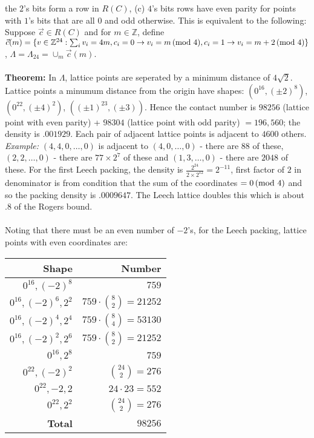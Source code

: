 the $2$'s bits form a row in $R(C)$, (c) $4$'s bits rows have even parity for points
with $1$'s bits that are all $0$ and odd otherwise. This is equivalent to the following:
Suppose ${\vec c} \in R(C)$ and for $m \in {\mathbb Z}$, define
${\vec c}(m)= \{  
v \in {\mathbb Z}^{24}:  \sum_i v_i = 4m, 
c_i = 0 \rightarrow v_i = m \thinspace \textnormal{(mod } 4 \textnormal{)},
c_i = 1 \rightarrow v_i = m+2 \thinspace \textnormal{(mod } 4 \textnormal{)}
\}$,
$\Lambda = \Lambda_{24}= \cup_m {\vec c}(m)$.
\\
\\
{\bf Theorem:}   In $\Lambda$, lattice points are seperated by a minimum
distance of $4 {\sqrt 2}$.  Lattice points a minumum distance from the origin
have shapes: $(0^{16}, (\pm 2)^8)$, $(0^{22}, (\pm 4)^2)$, $((\pm 1)^{23}, (\pm 3))$.  
Hence the contact number is $98256$ (lattice point with even parity) + $98304$ 
(lattice point with odd parity) $= 196,560$;  
the density is $.001929$.  Each pair of adjacent lattice points is adjacent to $4600$
others. \emph{Example:} $(4,4, 0, \ldots, 0)$
is adjacent to $(4,0, \ldots , 0)$ - there are $88$ of these,
$(2,2, \ldots , 0)$ - there are $77 \times 2^7$ of these and
$(1,3, \ldots , 0)$ - there are $2048$ of these.
For the first Leech packing,
the density is ${\frac {2^{24}} { 2 \times 2^{12}}}= 2^{-11}$, 
first factor of $2$ in 
denominator is from condition that the sum of the
coordinates $= 0 \thinspace \textnormal{(mod } 4 \textnormal{)}$ and so the packing density is $.0009647$.  The
Leech lattice doubles this which is about $.8$ of the Rogers bound.
\\
\\
Noting that there must be an even number of $-2$'s,
for the Leech packing, lattice points with even coordinates are:
\begin{center}
\begin{tabular} {|r|r|}
\hline
{\bf Shape} & {\bf Number} \\
\hline
$0^{16}, (-2)^8$ & $759$ \\
$0^{16}, (-2)^6, 2^2$ & $759 \cdot {8 \choose 2}=21252$ \\
$0^{16}, (-2)^4, 2^4$ & $759 \cdot {8 \choose 4}=53130$ \\
$0^{16}, (-2)^2, 2^6$ & $759 \cdot {8 \choose 2}=21252$ \\
$0^{16}, 2^8$ & $759$ \\
$0^{22}, (-2)^2$ & ${24 \choose 2}=276$ \\
$0^{22}, -2, 2$ & $ 24 \cdot 23 =552$ \\
$0^{22}, 2^2$ & ${24 \choose 2}=276$ \\
\hline
{\bf Total} & $98256$\\
\hline
\end{tabular}
\end{center}
